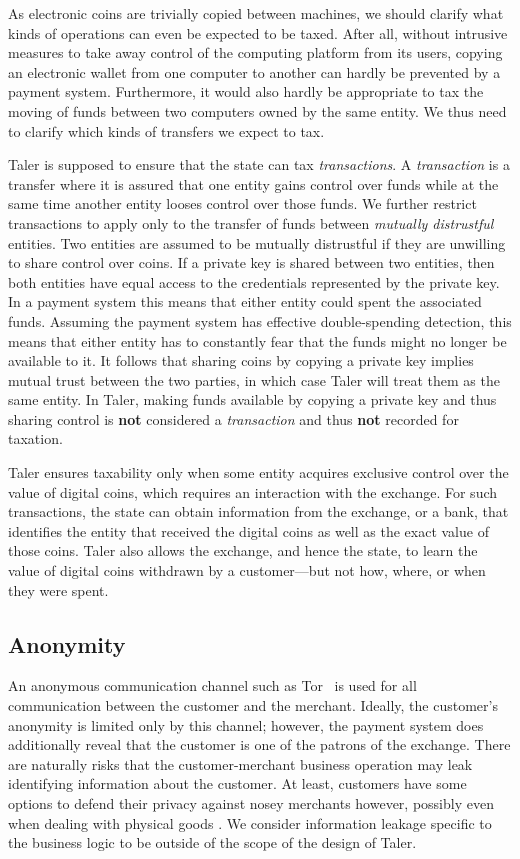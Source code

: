 \documentclass{llncs}
\begin{document}
As electronic coins are trivially copied between machines, we should
clarify what kinds of operations can even be expected to be taxed.
After all, without intrusive measures to take away control of the
computing platform from its users, copying an electronic wallet from
one computer to another can hardly be prevented by a payment system.
Furthermore, it would also hardly be appropriate to tax the moving of
funds between two computers owned by the same entity.  We thus
need to clarify which kinds of transfers we expect to tax.

Taler is supposed to ensure that the state can tax {\em transactions}.
A {\em transaction} is a transfer where it is assured that one entity
gains control over funds while at the same time another entity looses
control over those funds.  We further restrict transactions to apply
only to the transfer of funds between {\em mutually distrustful}
entities.  Two entities are assumed to be mutually distrustful if they
are unwilling to share control over coins.  If a private key is shared
between two entities, then both entities have equal access to the
credentials represented by the private key.  In a payment system this
means that either entity could spent the associated funds.  Assuming
the payment system has effective double-spending detection, this means
that either entity has to constantly fear that the funds might no
longer be available to it.  It follows that sharing coins by copying
a private key implies mutual trust between the two parties, in which
case Taler will treat them as the same entity.
In Taler, making funds available by copying a private key and thus
sharing control is {\bf not} considered a {\em transaction} and
thus {\bf not} recorded for taxation.

Taler ensures taxability only when some entity acquires exclusive
control over the value of digital coins, which requires an interaction
with the exchange.  For such transactions, the state can obtain information
from the exchange, or a bank, that identifies the entity that received the
digital coins as well as the exact value of those coins.
Taler also allows the exchange, and hence the state, to learn the value of
digital coins withdrawn by a customer---but not how, where, or when
they were spent.

\subsection{Anonymity}

An anonymous communication channel such as Tor~\cite{tor-design} is
used for all communication between the customer and the merchant.
Ideally, the customer's anonymity is limited only by this channel;
however, the payment system does additionally reveal that the customer
is one of the patrons of the exchange.
There are naturally risks that the customer-merchant business operation
may leak identifying information about the customer.   At least, customers
have some options to defend their privacy against nosey merchants however,
possibly even when dealing with physical goods \cite{apod}.
We consider information leakage specific to the business logic to be
outside of the scope of the design of Taler.
\end{document}
